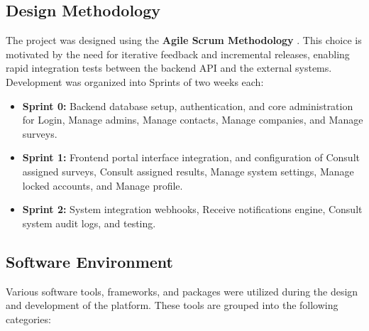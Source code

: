 \documentclass[12pt,a4paper]{report}
\begin{document}
\subsection{Design Methodology}
The project was designed using the \textbf{Agile Scrum Methodology} \cite{scrum, sommerville}. This choice is motivated by the need for iterative feedback and incremental releases, enabling rapid integration tests between the backend API and the external systems. 
Development was organized into Sprints of two weeks each:
\begin{itemize}
    \item \textbf{Sprint 0:} Backend database setup, authentication, and core administration for Login, Manage admins, Manage contacts, Manage companies, and Manage surveys.
    \item \textbf{Sprint 1:} Frontend portal interface integration, and configuration of Consult assigned surveys, Consult assigned results, Manage system settings, Manage locked accounts, and Manage profile.
    \item \textbf{Sprint 2:} System integration webhooks, Receive notifications engine, Consult system audit logs, and testing.
\end{itemize}

\subsection{Software Environment}
Various software tools, frameworks, and packages were utilized during the design and development of the platform. These tools are grouped into the following categories:
\end{document}
